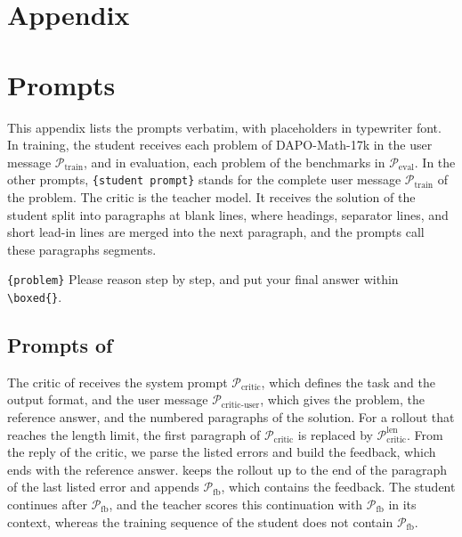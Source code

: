 \clearpage
\setcounter{topnumber}{3}
\setcounter{dbltopnumber}{2}
\setcounter{totalnumber}{4}
\renewcommand{\topfraction}{0.9}
\renewcommand{\dbltopfraction}{0.9}
\renewcommand{\textfraction}{0.1}
\renewcommand{\floatpagefraction}{0.9}
\renewcommand{\dblfloatpagefraction}{0.9}

\section*{Appendix}

\startcontents[appendix]

\vspace{1em}

\section{Prompts}
\label{app:prompts}

This appendix lists the prompts verbatim, with placeholders in typewriter font.
In training, the student receives each problem of DAPO-Math-17k in the user message $\mathcal{P}_{\text{train}}$, and in evaluation, each problem of the benchmarks in $\mathcal{P}_{\text{eval}}$.
In the other prompts, \texttt{\{student prompt\}} stands for the complete user message $\mathcal{P}_{\text{train}}$ of the problem.
The critic is the teacher model.
It receives the solution of the student split into paragraphs at blank lines, where headings, separator lines, and short lead-in lines are merged into the next paragraph, and the prompts call these paragraphs segments.

\begin{prompt}[title={$\mathcal{P}_{\text{eval}}$ --- user message of the student and the teacher in evaluation}]
\texttt{\{problem\}} Please reason step by step, and put your final answer within \verb|\boxed{}|.
\end{prompt}

\subsection{Prompts of \ours{}}
\label{app:prompts-method}

The critic of \ours{} receives the system prompt $\mathcal{P}_{\text{critic}}$, which defines the task and the output format, and the user message $\mathcal{P}_{\text{critic-user}}$, which gives the problem, the reference answer, and the numbered paragraphs of the solution.
For a rollout that reaches the length limit, the first paragraph of $\mathcal{P}_{\text{critic}}$ is replaced by $\mathcal{P}_{\text{critic}}^{\text{len}}$.
From the reply of the critic, we parse the listed errors and build the feedback, which ends with the reference answer.
\ours{} keeps the rollout up to the end of the paragraph of the last listed error and appends $\mathcal{P}_{\text{fb}}$, which contains the feedback.
The student continues after $\mathcal{P}_{\text{fb}}$, and the teacher scores this continuation with $\mathcal{P}_{\text{fb}}$ in its context, whereas the training sequence of the student does not contain $\mathcal{P}_{\text{fb}}$.

